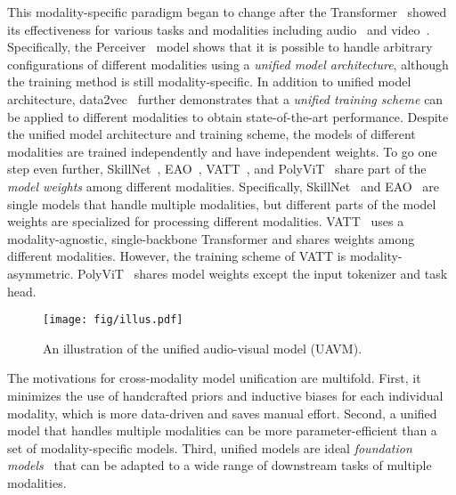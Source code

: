 \documentclass[journal]{IEEEtran}
\newcommand{\squeezeup}{\vspace{-1.6mm}}
\newcommand{\rev}[1]{{\color{dblue} #1}}
\begin{document}
\rev{This modality-specific paradigm began to change after the Transformer~\cite{vaswani2017attention} showed its effectiveness for various tasks and modalities including audio~\cite{gong21b_interspeech,gong2022ssast,ao2022speecht5} and video~\cite{dosovitskiy2020image,touvron2021training}.}
Specifically, the Perceiver~\cite{jaegle2021perceiver} model shows that it is possible to handle arbitrary configurations of different modalities using a \emph{unified model architecture}, although the training method is still modality-specific. In addition to unified model architecture, data2vec~\cite{baevski2022data2vec} further demonstrates that a \emph{unified training scheme} can be applied to different modalities to obtain state-of-the-art performance. Despite the unified model architecture and training scheme, the models of different modalities are trained independently and have independent weights. To go one step even further, SkillNet~\cite{dai2022one}, EAO~\cite{shvetsova2022everything}, VATT~\cite{akbari2021vatt}, and PolyViT~\cite{likhosherstov2021polyvit} share part of the \emph{model weights} among different modalities. 
Specifically, SkillNet~\cite{dai2022one} and EAO~\cite{shvetsova2022everything} are single models that handle multiple modalities, but different parts of the model weights are specialized for processing different modalities. 
VATT~\cite{akbari2021vatt} uses a modality-agnostic, single-backbone Transformer and shares weights among different modalities. However, the training scheme of VATT is modality-asymmetric. PolyViT~\cite{likhosherstov2021polyvit} shares model weights except the input tokenizer and task head. 


\begin{figure}[t]
\centering
\texttt{[image: fig/illus.pdf]}
\squeezeup\squeezeup
\caption{An illustration of the unified audio-visual model (UAVM).}
\label{fig:illustration}
\squeezeup\squeezeup\squeezeup
\end{figure}



The motivations for cross-modality model unification are multifold. First, it minimizes the use of handcrafted priors and inductive biases for each individual modality, which is more data-driven and saves manual effort. Second, a unified model that handles multiple modalities can be more parameter-efficient than a set of modality-specific models. Third, unified models are ideal \emph{foundation models}~\cite{Bommasani2021FoundationModels} that can be adapted to a wide range of downstream tasks of multiple modalities.
\end{document}
